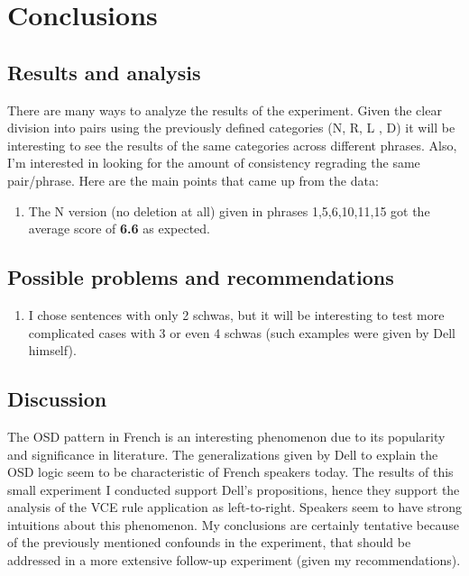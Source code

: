 \documentclass{article}
\begin{document}
\section{Conclusions}

\subsection{Results and analysis}
There are many ways to analyze the results of the experiment. Given the clear division into pairs using the previously defined categories (N, R, L , D) it will be interesting to see the results of the same categories across different phrases.  Also,  I'm interested in looking for the amount of consistency regrading the same pair/phrase.  Here are the main points that came up from the data:
\begin{enumerate}
  \item The N version (no deletion at all) given in phrases 1,5,6,10,11,15 got the average score of \textbf{6.6} as expected.
\end{enumerate}

\subsection{Possible problems and recommendations}
\begin{enumerate}
  \item I chose sentences with only 2 schwas, but it will be interesting to test more complicated cases with 3 or even 4 schwas (such examples were given by Dell himself).
\end{enumerate}

\subsection{Discussion}
The OSD pattern in French is an interesting phenomenon due to its popularity and significance in literature. The generalizations given by Dell to explain the OSD logic seem to be characteristic of French speakers today. The results of this small experiment I conducted support Dell's propositions, hence they support the analysis of the VCE rule application as left-to-right. Speakers seem to have strong intuitions about this phenomenon.
My conclusions are certainly tentative because of the previously mentioned confounds in the experiment,  that should be addressed in a more extensive follow-up experiment (given my recommendations).
\end{document}
